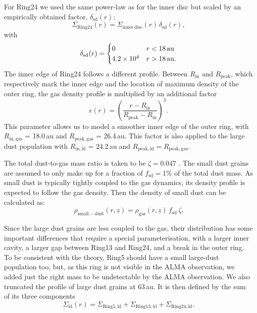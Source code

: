 \documentclass[fleqn,usenatbib,useAMS]{mnras}
\begin{document}
For Ring24 we used the same power-law as for the inner disc but scaled by an empirically obtained factor, $\delta_{\mathrm{sd}}(r)$:
\begin{equation}
  \Sigma_{\mathrm{Ring24}}(r) = \Sigma_{\mathrm{inner\,disc}}(r)\, \delta_{\mathrm{sd}}(r),
\end{equation}
with
\begin{equation}
  \delta_{\mathrm{sd}}(r) =
  \begin{cases}
  0    & r < 18\text{\,au} \\
  4.2\times 10^4 & r > 18\text{\,au}.
  \end{cases}
\end{equation}
The inner edge of Ring24 follows a different profile. Between $R_\mathrm{in}$ and $R_\mathrm{peak}$, which respectively mark  the inner edge and the location of maximum density of the outer ring, the gas density profile is multiplied by an additional factor
\begin{equation}
    \epsilon(r) = \left(\frac{ r - R_\mathrm{in}}{R_\mathrm{peak} - R_\mathrm{in}}\right)^3.
\end{equation}
This parameter allows us to model a smoother inner edge of the outer ring, with $R_\mathrm{in,gas}$ = 18.0\,au and $R_\mathrm{peak,gas}$ = 26.4\,au. This factor is also applied to the large dust population with $R_\mathrm{in,ld}$ = 24.2\,au and $R_\mathrm{peak,ld} = R_\mathrm{peak,gas}$. 

The total dust-to-gas mass ratio is taken to be $\zeta = 0.047$ \citep[as in][]{Rosenfeld_2013}. The small dust grains are assumed to only make up for a fraction of $f_\mathrm{sd}=1\%$ of the total dust mass. As small dust is typically tightly coupled to the gas dynamics, its density profile is expected to follow the gas density. Then the density of small dust can be calculated as:
\begin{equation}
\rho_{\mathrm{small-dust}}(r,z)=\rho_{\mathrm{gas}}(r,z)\, f_{\mathrm{sd}} \: \zeta .
\end{equation}

Since the large dust grains are less coupled to the gas, their distribution has some important differences that require a special parameterisation, with a larger inner cavity, a larger gap between Ring13 and Ring24, and a break in the outer ring. To be consistent with the theory, Ring5 should have a small large-dust population too, but, as this ring is not visible in the ALMA observation, we added just the right mass to be undetectable by the ALMA observation. We also truncated the profile of large dust grains at 63\,au. It is then defined by the sum of its three components
\begin{equation}
  \Sigma_{\mathrm{ld}}(r) = \Sigma_{\mathrm{Ring5,ld}} + 
  \Sigma_{\mathrm{Ring13,ld}} + \Sigma_{\mathrm{Ring24,ld}}.
\end{equation}
\end{document}
